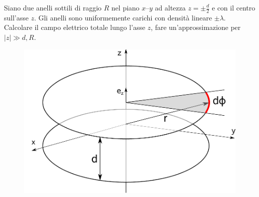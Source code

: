 \begin{Es}
 Siano due anelli sottili di raggio $R$ nel piano $x$--$y$ ad altezza $z=\pm\frac{d}{2}$ e con il centro sull'asse $z$. Gli anelli sono uniformemente carichi con densità lineare $\pm\lambda$. Calcolare il campo elettrico totale lungo l'asse $z$, fare un'approssimazione per $|z|\gg d,R$.
\begin{figure}[htbp]
 \centering
 \includegraphics[scale=0.5]{immagini/fisica2/due_anelli_schema}
\end{figure}


\end{Es}
